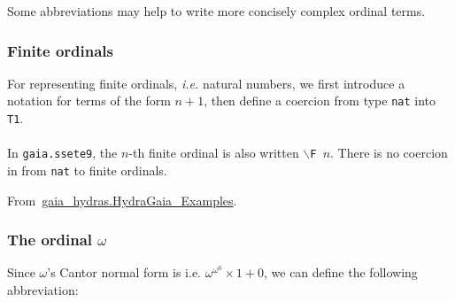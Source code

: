 Some abbreviations may help to write more concisely complex ordinal terms.

\subsubsection{Finite ordinals}
\label{sec:orgheadline67}

For representing finite ordinals, \emph{i.e.} natural numbers, we first introduce a notation for terms of the form $n+1$, then define a coercion from type \texttt{nat} into \texttt{T1}.
\label{sect:notation-FS}

\label{sect:notation-F}



\paragraph*{\gaiasign}
  In \texttt{gaia.ssete9}, the $n$-th finite ordinal is also written
  \texttt{$\backslash${F}\,$n$}. There is no coercion in \gaia from \texttt{nat} to finite ordinals.

  \vspace{4pt}
  
  From~\href{../theories/html/gaia_hydras.HydraGaia_Examples.html}{gaia\_hydras.HydraGaia\_Examples}.

  




\subsubsection{The ordinal \(\omega\)}
\label{sec:orgheadline68}

  Since \(\omega\)'s Cantor normal form is
i.e. \(\omega^{\omega^0}\times 1+ 0\), we can define the following abbreviation:

